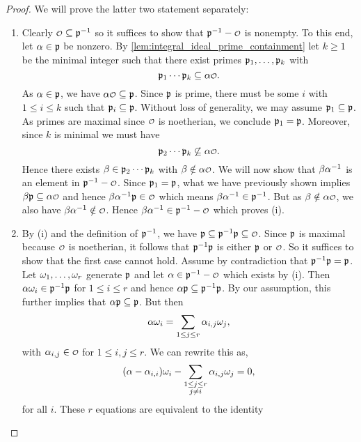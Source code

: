     \begin{proof}
      We will prove the latter two statement separately:
      \begin{enumerate}[label=(\roman*)]
        \item Clearly $\smc{O} \subseteq \mf{p}^{-1}$ so it suffices to show that $\mf{p}^{-1}-\smc{O}$ is nonempty. To this end, let $\alpha \in \mathfrak{p}$ be nonzero. By \cref{lem:integral_ideal_prime_containment} let $k \ge 1$ be the minimal integer such that there exist primes $\mathfrak{p}_{1},\ldots,\mathfrak{p}_{k}$ with
        \[
          \mf{p}_{1} \cdots \mf{p}_{k} \subseteq \a\smc{O}.
        \]
        As $\alpha \in \mathfrak{p}$, we have $\a\smc{O} \subseteq \mf{p}$. Since $\mathfrak{p}$ is prime, there must be some $i$ with $1 \le i \le k$ such that $\mathfrak{p}_{i} \subseteq \mathfrak{p}$. Without loss of generality, we may assume $\mathfrak{p}_{1} \subseteq \mathfrak{p}$. As primes are maximal since $\smc{O}$ is noetherian, we conclude $\mathfrak{p}_{1} = \mathfrak{p}$. Moreover, since $k$ is minimal we must have
        \[
          \mf{p}_{2} \cdots \mf{p}_{k} \not\subseteq \a\smc{O}.
        \]
        Hence there exists $\beta \in \mathfrak{p}_{2} \cdots \mathfrak{p}_{k}$ with $\b \notin \a\smc{O}$. We will now show that $\beta\alpha^{-1}$ is an element in $\mf{p}^{-1}-\smc{O}$. Since $\mathfrak{p}_{1} = \mathfrak{p}$, what we have previously shown implies $\b\mf{p} \subseteq \a\smc{O}$ and hence $\b\a^{-1}\mf{p} \in \smc{O}$ which means $\beta\alpha^{-1} \in \mathfrak{p}^{-1}$. But as $\b \notin \a\smc{O}$, we also have $\b\a^{-1} \notin \smc{O}$. Hence $\b\a^{-1} \in \mf{p}^{-1}-\smc{O}$ which proves (i).
        \item By (i) and the definition of $\mathfrak{p}^{-1}$, we have $\mf{p} \subseteq \mf{p}^{-1}\mf{p} \subseteq \smc{O}$. Since $\mathfrak{p}$ is maximal because $\smc{O}$ is noetherian, it follows that $\mathfrak{p}^{-1}\mathfrak{p}$ is either $\mathfrak{p}$ or $\smc{O}$. So it suffices to show that the first case cannot hold. Assume by contradiction that $\mathfrak{p}^{-1}\mathfrak{p} = \mathfrak{p}$. Let $\omega_{1},\ldots,\omega_{r}$ generate $\mathfrak{p}$ and let $\a \in \mf{p}^{-1}-\smc{O}$ which exists by (i). Then $\alpha\omega_{i} \in \mathfrak{p}^{-1}\mathfrak{p}$ for $1 \le i \le r$ and hence $\alpha\mathfrak{p} \subseteq \mathfrak{p}^{-1}\mathfrak{p}$. By our assumption, this further implies that $\alpha\mathfrak{p} \subseteq \mathfrak{p}$. But then
        \[
          \alpha\omega_{i} = \sum_{1 \le j \le r}\alpha_{i,j}\omega_{j},
        \]
        with $\a_{i,j} \in \smc{O}$ for $1 \le i,j \le r$. We can rewrite this as,
        \[
          (\alpha-\alpha_{i,i})\omega_{i}-\sum_{\substack{1 \le j \le r \\ j \neq i}}\alpha_{i,j}\omega_{j} = 0,
        \]
        for all $i$. These $r$ equations are equivalent to the identity

\end{enumerate}
\end{proof}
